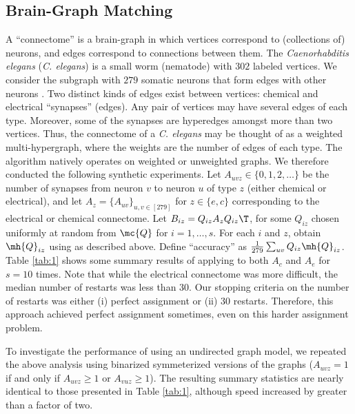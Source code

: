 \documentclass[10pt,journal,cspaper,compsoc]{IEEEtran}
\begin{document}


\subsection{Brain-Graph Matching} %
\label{sub:connectome_classification}

A ``connectome'' is a brain-graph in which vertices correspond to (collections of) neurons, and edges correspond to connections between them. The \emph{Caenorhabditis elegans} (\emph{C. elegans}) is a small worm (nematode) with $302$ labeled vertices.  We consider the subgraph with $279$ somatic neurons that form edges with other neurons \cite{WhiteBrenner86, Varshney2011}.  Two distinct kinds of edges exist between vertices: chemical and electrical ``synapses'' (edges). Any pair of vertices may have several edges of each type. Moreover, some of the synapses are hyperedges amongst more than two vertices.    Thus, the connectome of a \emph{C. elegans} may be thought of as a weighted multi-hypergraph, where the weights are the number of edges of each type.  The \rqapm algorithm natively operates on weighted or unweighted graphs.  We therefore conducted the following synthetic experiments.  Let $A_{uvz} \in \{0,1,2,\ldots\}$ be the number of synapses from neuron $v$ to neuron $u$ of type $z$ (either chemical or electrical), and let $A_z=\{A_{uv}\}_{u,v \in [279]}$ for $z \in \{e,c\}$ corresponding to the electrical or chemical connectome.  Let $B_{iz}=Q_{iz} A_z Q_{iz}\T$, for some $Q_{iz}$ chosen uniformly at random from $\mc{Q}$ for $i=1,\ldots,s$.  For each $i$ and $z$, obtain $\mh{Q}_{iz}$ using \rqapm as described above.  Define ``accuracy'' as $\frac{1}{279}\sum_{uv} Q_{iz} \mh{Q}_{iz}$.  Table \ref{tab:1} shows some summary results of applying \rqapm to both $A_c$ and $A_e$ for $s=10$ times.  
Note that while the electrical connectome was more difficult, the median number of restarts was less than $30$.  Our stopping criteria on the number of restarts was either (i) perfect assignment or (ii) 30 restarts.  Therefore, this approach achieved perfect assignment sometimes, even on this harder assignment problem.

To investigate the performance of \rqap using an undirected graph model, we repeated the above analysis using binarized symmeterized versions of the graphs ($A_{uvz}=1$ if and only if $A_{uvz}\geq 1$ or $A_{vuz} \geq 1$).  The resulting summary statistics are nearly identical to those presented in Table \ref{tab:1}, although speed increased by greater than a factor of two.
\end{document}
